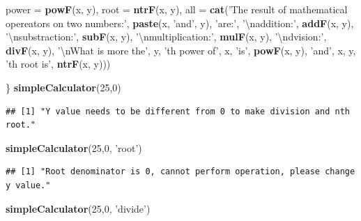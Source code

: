 \documentclass[]{book}
\newenvironment{Shaded}{\begin{snugshade}}{\end{snugshade}}
\newcommand{\KeywordTok}[1]{\textcolor[rgb]{0.13,0.29,0.53}{\textbf{#1}}}
\newcommand{\DataTypeTok}[1]{\textcolor[rgb]{0.13,0.29,0.53}{#1}}
\newcommand{\DecValTok}[1]{\textcolor[rgb]{0.00,0.00,0.81}{#1}}
\newcommand{\CharTok}[1]{\textcolor[rgb]{0.31,0.60,0.02}{#1}}
\newcommand{\StringTok}[1]{\textcolor[rgb]{0.31,0.60,0.02}{#1}}
\newcommand{\NormalTok}[1]{#1}
\theoremstyle{definition}
\theoremstyle{definition}
\theoremstyle{definition}
\theoremstyle{remark}
\begin{document}
\begin{Shaded}
\begin{Highlighting}[]
         \DataTypeTok{power =} \KeywordTok{powF}\NormalTok{(x, y),}
         \DataTypeTok{root =} \KeywordTok{ntrF}\NormalTok{(x, y),}
         \DataTypeTok{all =} \KeywordTok{cat}\NormalTok{(}\StringTok{'The result of mathematical opereators on two numbers:'}\NormalTok{,}
                      \KeywordTok{paste}\NormalTok{(x, }\StringTok{'and'}\NormalTok{, y), }\StringTok{'are:'}\NormalTok{, }\StringTok{'}\CharTok{\textbackslash{}n}\StringTok{addition:'}\NormalTok{, }\KeywordTok{addF}\NormalTok{(x, y),}
                      \StringTok{'}\CharTok{\textbackslash{}n}\StringTok{substraction:'}\NormalTok{, }\KeywordTok{subF}\NormalTok{(x, y), }\StringTok{'}\CharTok{\textbackslash{}n}\StringTok{multiplication:'}\NormalTok{, }\KeywordTok{mulF}\NormalTok{(x, y),}
                      \StringTok{'}\CharTok{\textbackslash{}n}\StringTok{dvision:'}\NormalTok{, }\KeywordTok{divF}\NormalTok{(x, y), }\StringTok{'}\CharTok{\textbackslash{}n}\StringTok{What is more the'}\NormalTok{, y,}
                      \StringTok{'th power of'}\NormalTok{, x, }\StringTok{'is'}\NormalTok{, }\KeywordTok{powF}\NormalTok{(x, y), }\StringTok{'and'}\NormalTok{, x, y,}
                      \StringTok{'th root is'}\NormalTok{, }\KeywordTok{ntrF}\NormalTok{(x, y)))}

\NormalTok{\}}
\KeywordTok{simpleCalculator}\NormalTok{(}\DecValTok{25}\NormalTok{,}\DecValTok{0}\NormalTok{)}
\end{Highlighting}
\end{Shaded}

\begin{verbatim}
## [1] "Y value needs to be different from 0 to make division and nth root."
\end{verbatim}

\begin{Shaded}
\begin{Highlighting}[]
\KeywordTok{simpleCalculator}\NormalTok{(}\DecValTok{25}\NormalTok{,}\DecValTok{0}\NormalTok{, }\StringTok{'root'}\NormalTok{)}
\end{Highlighting}
\end{Shaded}

\begin{verbatim}
## [1] "Root denominator is 0, cannot perform operation, please change y value."
\end{verbatim}

\begin{Shaded}
\begin{Highlighting}[]
\KeywordTok{simpleCalculator}\NormalTok{(}\DecValTok{25}\NormalTok{,}\DecValTok{0}\NormalTok{, }\StringTok{'divide'}\NormalTok{)}
\end{Highlighting}
\end{Shaded}
\end{document}
